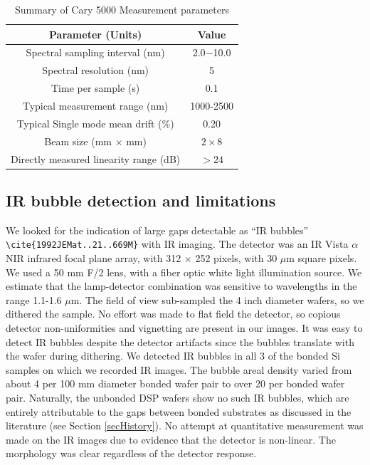 \documentclass[osajnl,preprint,showpacs,superscriptaddress,12pt]{revtex4-1} %
\begin{document}
\begin{table}[h!]
\caption{Summary of Cary 5000 Measurement parameters \label{tab:Cary5000pars}}
\begin{center}
\begin{tabular}{ c c }
\hline
        Parameter (Units) & Value \\ 
\hline
        Spectral sampling interval (nm) & 2.0$-$10.0 \\
        Spectral resolution (nm) & 5 \\
        Time per sample (s) & 0.1 \\
        Typical measurement range (nm) & 1000-2500 \\
	Typical Single mode mean drift (\%) & 0.20 \\
 	Beam size (mm $\times$ mm) & $2 \times 8$ \\
        Directly measured linearity range (dB) & $>24$ \\
    \hline
    \end{tabular}
\end{center}
\end{table}


\subsection{IR bubble detection and limitations}

We looked for the indication of large gaps detectable as ``IR bubbles'' \verb|\cite{1992JEMat..21..669M}| with IR imaging.  The detector was an IR Vista $\alpha$NIR infrared focal plane array, with 312 $\times$ 252 pixels, with 30 $\mu$m square pixels.  We used a 50 mm F/2 lens, with a fiber optic white light illumination source.  We estimate that the lamp-detector combination was sensitive to wavelengths in the range 1.1-1.6 $\mu$m.  The field of view sub-sampled the 4 inch diameter wafers, so we dithered the sample.  No effort was made to flat field the detector, so copious detector non-uniformities and vignetting are present in our images.  It was easy to detect IR bubbles despite the detector artifacts since the bubbles translate with the wafer during dithering.  We detected IR bubbles in all 3 of the bonded Si samples on which we recorded IR images.  The bubble areal density varied from about 4 per 100 mm diameter bonded wafer pair to over 20 per bonded wafer pair.  Naturally, the unbonded DSP wafers show no such IR bubbles, which are entirely attributable to the gaps between bonded substrates as discussed in the literature (see Section \ref{secHistory}).  No attempt at quantitative measurement was made on the IR images due to evidence that the detector is non-linear.  The morphology was clear regardless of the detector response.  
\end{document}
